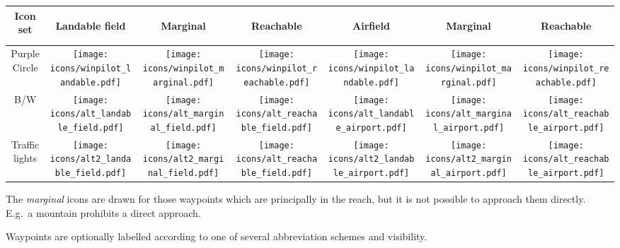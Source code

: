 \begin{tabular}{c|ccc|ccc|}
Icon set 
&\begin{sideways}Landable field\end{sideways}
&\begin{sideways}Marginal\end{sideways}
&\begin{sideways}Reachable\end{sideways}
&\begin{sideways}Airfield\end{sideways}
&\begin{sideways}Marginal\end{sideways}
&\begin{sideways}Reachable\end{sideways}\\
\hline
Purple Circle &
\texttt{[image: icons/winpilot\_landable.pdf]} &
\texttt{[image: icons/winpilot\_marginal.pdf]} &
\texttt{[image: icons/winpilot\_reachable.pdf]} &
\colorbox{white}{\texttt{[image: icons/winpilot\_landable.pdf]}} &
\texttt{[image: icons/winpilot\_marginal.pdf]} &
\texttt{[image: icons/winpilot\_reachable.pdf]} \\
\hline
B/W & 
\texttt{[image: icons/alt\_landable\_field.pdf]} &
\texttt{[image: icons/alt\_marginal\_field.pdf]} &
\texttt{[image: icons/alt\_reachable\_field.pdf]} &
\colorbox[rgb]{0.94,0.94,0.94}{\texttt{[image: icons/alt\_landable\_airport.pdf]}} &
\texttt{[image: icons/alt\_marginal\_airport.pdf]} &
\texttt{[image: icons/alt\_reachable\_airport.pdf]} \\
\hline
Traffic lights & 
\texttt{[image: icons/alt2\_landable\_field.pdf]} &
\texttt{[image: icons/alt2\_marginal\_field.pdf]} &
\texttt{[image: icons/alt\_reachable\_field.pdf]} &
\colorbox{white}{\texttt{[image: icons/alt2\_landable\_airport.pdf]}} &
\texttt{[image: icons/alt2\_marginal\_airport.pdf]} &
\texttt{[image: icons/alt\_reachable\_airport.pdf]} \\
\hline
\end{tabular}

The \emph{marginal} icons are drawn for those waypoints which are principally in the 
reach, but it is not possible to approach them directly. E.g.\ a mountain prohibits a direct approach.
  
Waypoints are optionally labelled according to one of several
abbreviation schemes  and visibility.

